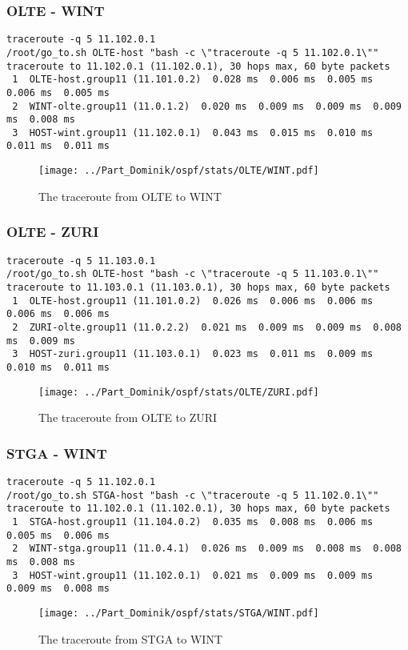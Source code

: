 \subsubsection{OLTE - WINT}
\begin{lstlisting}
traceroute -q 5 11.102.0.1
/root/go_to.sh OLTE-host "bash -c \"traceroute -q 5 11.102.0.1\""
traceroute to 11.102.0.1 (11.102.0.1), 30 hops max, 60 byte packets
 1  OLTE-host.group11 (11.101.0.2)  0.028 ms  0.006 ms  0.005 ms  0.006 ms  0.005 ms
 2  WINT-olte.group11 (11.0.1.2)  0.020 ms  0.009 ms  0.009 ms  0.009 ms  0.008 ms
 3  HOST-wint.group11 (11.102.0.1)  0.043 ms  0.015 ms  0.010 ms  0.011 ms  0.011 ms
\end{lstlisting}
\begin{figure}[H]
\centering
\texttt{[image: ../Part\_Dominik/ospf/stats/OLTE/WINT.pdf]}
\caption{The traceroute from OLTE to WINT}
\end{figure}
\clearpage
\subsubsection{OLTE - ZURI}
\begin{lstlisting}
traceroute -q 5 11.103.0.1
/root/go_to.sh OLTE-host "bash -c \"traceroute -q 5 11.103.0.1\""
traceroute to 11.103.0.1 (11.103.0.1), 30 hops max, 60 byte packets
 1  OLTE-host.group11 (11.101.0.2)  0.026 ms  0.006 ms  0.006 ms  0.006 ms  0.006 ms
 2  ZURI-olte.group11 (11.0.2.2)  0.021 ms  0.009 ms  0.009 ms  0.008 ms  0.009 ms
 3  HOST-zuri.group11 (11.103.0.1)  0.023 ms  0.011 ms  0.009 ms  0.010 ms  0.011 ms
\end{lstlisting}
\begin{figure}[H]
\centering
\texttt{[image: ../Part\_Dominik/ospf/stats/OLTE/ZURI.pdf]}
\caption{The traceroute from OLTE to ZURI}
\end{figure}
\clearpage
\subsubsection{STGA - WINT}
\begin{lstlisting}
traceroute -q 5 11.102.0.1
/root/go_to.sh STGA-host "bash -c \"traceroute -q 5 11.102.0.1\""
traceroute to 11.102.0.1 (11.102.0.1), 30 hops max, 60 byte packets
 1  STGA-host.group11 (11.104.0.2)  0.035 ms  0.008 ms  0.006 ms  0.005 ms  0.006 ms
 2  WINT-stga.group11 (11.0.4.1)  0.026 ms  0.009 ms  0.008 ms  0.008 ms  0.008 ms
 3  HOST-wint.group11 (11.102.0.1)  0.021 ms  0.009 ms  0.009 ms  0.009 ms  0.008 ms
\end{lstlisting}
\begin{figure}[H]
\centering
\texttt{[image: ../Part\_Dominik/ospf/stats/STGA/WINT.pdf]}
\caption{The traceroute from STGA to WINT}
\end{figure}
\clearpage
